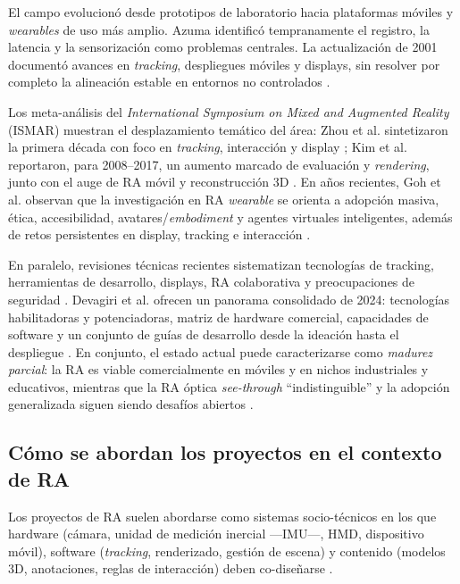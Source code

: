 \documentclass[conference]{IEEEtran}
\begin{document}
El campo evolucionó desde prototipos de laboratorio hacia plataformas móviles y \textit{wearables} de uso más amplio. Azuma \cite{Azuma1997} identificó tempranamente el registro, la latencia y la sensorización como problemas centrales. La actualización de 2001 documentó avances en \textit{tracking}, despliegues móviles y displays, sin resolver por completo la alineación estable en entornos no controlados \cite{Azuma2001}.

Los meta-análisis del \textit{International Symposium on Mixed and Augmented Reality} (ISMAR) muestran el desplazamiento temático del área: Zhou et al. sintetizaron la primera década con foco en \textit{tracking}, interacción y display \cite{Zhou2008}; Kim et al. reportaron, para 2008–2017, un aumento marcado de evaluación y \textit{rendering}, junto con el auge de RA móvil y reconstrucción 3D \cite{Kim2018}. En años recientes, Goh et al. observan que la investigación en RA \textit{wearable} se orienta a adopción masiva, ética, accesibilidad, avatares/\textit{embodiment} y agentes virtuales inteligentes, además de retos persistentes en display, tracking e interacción \cite{Goh2023}.

En paralelo, revisiones técnicas recientes sistematizan tecnologías de tracking, herramientas de desarrollo, displays, RA colaborativa y preocupaciones de seguridad \cite{Syed2023}. Devagiri et al. ofrecen un panorama consolidado de 2024: tecnologías habilitadoras y potenciadoras, matriz de hardware comercial, capacidades de software y un conjunto de guías de desarrollo desde la ideación hasta el despliegue \cite{Devagiri2024}. En conjunto, el estado actual puede caracterizarse como \textit{madurez parcial}: la RA es viable comercialmente en móviles y en nichos industriales y educativos, mientras que la RA óptica \textit{see-through} ``indistinguible'' y la adopción generalizada siguen siendo desafíos abiertos \cite{Goh2023,Devagiri2024}.

\subsection{Cómo se abordan los proyectos en el contexto de RA}

Los proyectos de RA suelen abordarse como sistemas socio-técnicos en los que hardware (cámara, unidad de medición inercial ---IMU---, HMD, dispositivo móvil), software (\textit{tracking}, renderizado, gestión de escena) y contenido (modelos 3D, anotaciones, reglas de interacción) deben co-diseñarse \cite{Schmalstieg2016,Devagiri2024}.
\end{document}
